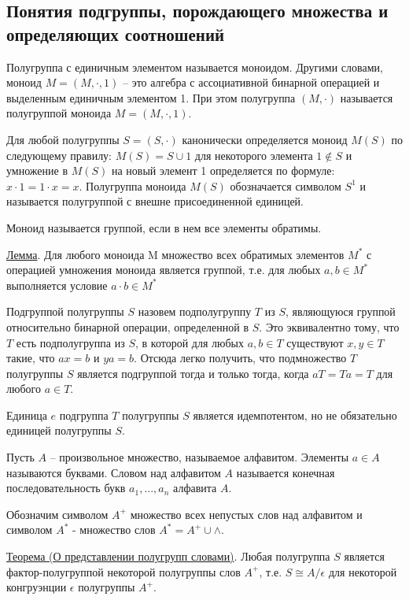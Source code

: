 \documentclass[bachelor, och, labwork]{shiza}
\begin{document}
	    \subsection{Понятия подгруппы, порождающего множества и определяющих соотношений}	
	
	 Полугруппа с единичным элементом называется моноидом. Другими словами, моноид $M = (M,\cdot ,1)$ – это алгебра с ассоциативной бинарной операцией и выделенным единичным элементом 1. При этом полугруппа $(M,\cdot)$ называется полугруппой моноида $M = (M,\cdot ,1)$.
	 
	Для любой полугруппы $S = (S,\cdot)$ канонически определяется моноид $M(S)$ по следующему правилу: $M(S) = S \cup {1} $ для некоторого элемента $1\notin S$ и умножение в $M(S)$ на новый элемент 1 определяется по формуле: $x \cdot 1=1 \cdot x = x$. Полугруппа моноида $M(S)$ обозначается символом $S^1$ и называется полугруппой с внешне присоединенной единицей.
	
	Моноид называется группой, если в нем все элементы обратимы.
	
	\underline{Лемма}. Для любого моноида M множество всех обратимых элементов $M^*$ с операцией умножения моноида является группой, т.е. для любых $a,b \in M^*$  выполняется условие $a \cdot b \in M^*$
	
	Подгруппой полугруппы $S$ назовем подполугруппу $T$ из $S$, являющуюся группой относительно бинарной операции, определенной в $S$. Это эквивалентно тому, что $T$ есть подполугруппа из $S$, в которой для любых $a,b \in T$ существуют $x,y \in T$ такие, что $ax=b$ и $ya=b$. Отсюда легко получить, что подмножество $T$ полугруппы $S$ является подгруппой тогда и только тогда, когда $aT=Ta=T$ для любого $a \in T$.
	
	Единица $e$ подгруппа $T$ полугруппы $S$ является идемпотентом, но не обязательно единицей полугруппы $S$.
	
	Пусть $A$ – произвольное множество, называемое алфавитом. Элементы $a \in A$ называются буквами. Словом над алфавитом $A$ называется конечная последовательность букв $a_1,...,a_n$ алфавита $A$.
	
	Обозначим символом $A^+$ множество всех непустых слов над алфавитом и символом $A^*$ - множество слов $A^* = A^+ \cup {\land}$.
	
	\underline{Теорема (О представлении полугрупп словами)}. Любая полугруппа $S$ является фактор-полугруппой некоторой полугруппы слов $A^+$, т.е. $S \cong A/\epsilon$ для некоторой конгруэнции $\epsilon$ полугруппы $A^+$.
	
\end{document}
